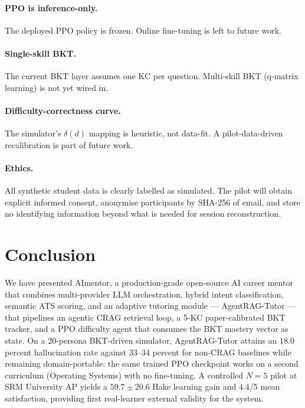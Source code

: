 \documentclass[conference]{IEEEtran}
\begin{document}
\paragraph{PPO is inference-only.}
The deployed PPO policy is frozen. Online fine-tuning is left to
future work.

\paragraph{Single-skill BKT.}
The current BKT layer assumes one KC per question. Multi-skill BKT
(q-matrix learning) is not yet wired in.

\paragraph{Difficulty-correctness curve.}
The simulator's $\delta(d)$ mapping is heuristic, not data-fit. A
pilot-data-driven recalibration is part of future work.

\paragraph{Ethics.}
All synthetic student data is clearly labelled as simulated. The
pilot will obtain explicit informed consent, anonymise participants
by SHA-256 of email, and store no identifying information beyond
what is needed for session reconstruction.

\section{Conclusion}\label{sec:conclude}

We have presented AImentor, a production-grade open-source AI career
mentor that combines multi-provider LLM orchestration, hybrid intent
classification, semantic ATS scoring, and an adaptive tutoring
module --- AgentRAG-Tutor --- that pipelines an agentic CRAG
retrieval loop, a 5-KC paper-calibrated BKT tracker, and a PPO
difficulty agent that consumes the BKT mastery vector as state. On a
20-persona BKT-driven simulator, AgentRAG-Tutor attains an 18.0
percent hallucination rate against 33--34 percent for non-CRAG
baselines while remaining domain-portable: the same trained PPO
checkpoint works on a second curriculum (Operating Systems) with no
fine-tuning. A controlled $N{=}5$ pilot at SRM University AP yields a
$59.7{\pm}20.6$ Hake learning gain and 4.4/5 mean satisfaction,
providing first real-learner external validity for the system.
\end{document}
